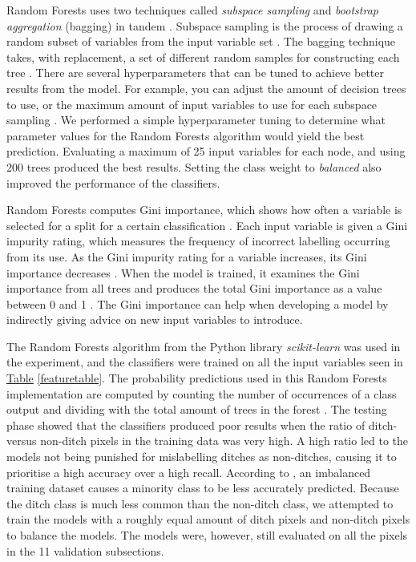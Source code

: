 \documentclass[]{interact}
\theoremstyle{plain}%
\theoremstyle{definition}
\theoremstyle{remark}
\begin{document}
Random Forests uses two techniques called \textit{subspace sampling} and \textit{bootstrap aggregation} (bagging) in tandem \citep{breiman}. Subspace sampling is the process of drawing a random subset of variables from the input variable set \citet{ho}. The bagging technique takes, with replacement, a set of different random samples for constructing each tree \citep{flach}. There are several hyperparameters that can be tuned to achieve better results from the model. For example, you can adjust the amount of decision trees to use, or the maximum amount of input variables to use for each subspace sampling \citep{scikit-learn}. We performed a simple hyperparameter tuning to determine what parameter values for the Random Forests algorithm would yield the best prediction. Evaluating a maximum of 25 input variables for each node, and using 200 trees produced the best results. Setting the class weight to \textit{balanced} also improved the performance of the classifiers.

\newpage

Random Forests computes Gini importance, which shows how often a variable is selected for a split for a certain classification \citep{gini}. Each input variable is given a Gini impurity rating, which measures the frequency of incorrect labelling occurring from its use. As the Gini impurity rating for a variable increases, its Gini importance decreases \citep{gini}. When the model is trained, it examines the Gini importance from all trees and produces the total Gini importance as a value between 0 and 1 \citep{gini}. The Gini importance can help when developing a model by indirectly giving advice on new input variables to introduce.

The Random Forests algorithm from the Python library \textit{scikit-learn} was used in the experiment, and the classifiers were trained on all the input variables seen in \hyperref[featuretable]{Table} \ref{featuretable}. The probability predictions used in this Random Forests implementation are computed by counting the number of occurrences of a class output and dividing with the total amount of trees in the forest \citep{scikit-learn}. The testing phase showed that the classifiers produced poor results when the ratio of ditch- versus non-ditch pixels in the training data was very high. A high ratio led to the models not being punished for mislabelling ditches as non-ditches, causing it to prioritise a high accuracy over a high recall. According to \citet{balanced}, an imbalanced training dataset causes a minority class to be less accurately predicted. Because the ditch class is much less common than the non-ditch class, we attempted to train the models with a roughly equal amount of ditch pixels and non-ditch pixels to balance the models. The models were, however, still evaluated on all the pixels in the 11 validation subsections.
\end{document}
